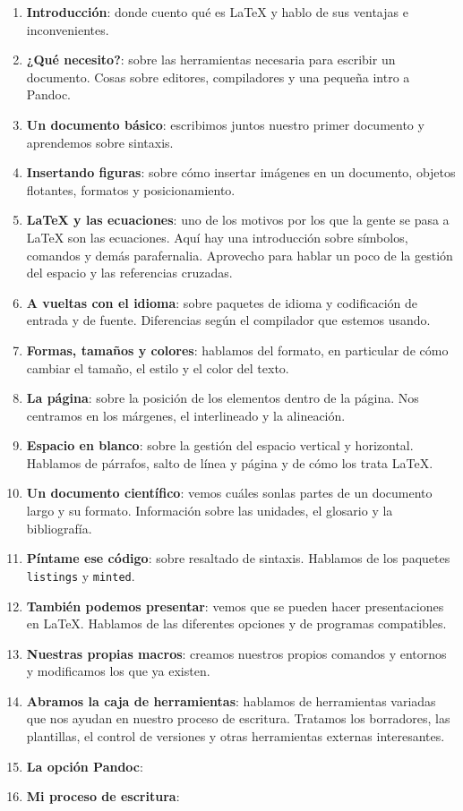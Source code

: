 \begin{enumerate}
\item
  \textbf{Introducción}: donde cuento qué es LaTeX y hablo de sus
  ventajas e inconvenientes.
\item
  \textbf{¿Qué necesito?}: sobre las herramientas necesaria para
  escribir un documento. Cosas sobre editores, compiladores y una
  pequeña intro a Pandoc.
\item
  \textbf{Un documento básico}: escribimos juntos nuestro primer
  documento y aprendemos sobre sintaxis.
\item
  \textbf{Insertando figuras}: sobre cómo insertar imágenes en un
  documento, objetos flotantes, formatos y posicionamiento.
\item
  \textbf{LaTeX y las ecuaciones}: uno de los motivos por los que la
  gente se pasa a LaTeX son las ecuaciones. Aquí hay una introducción
  sobre símbolos, comandos y demás parafernalia. Aprovecho para hablar
  un poco de la gestión del espacio y las referencias cruzadas.
\item
  \textbf{A vueltas con el idioma}: sobre paquetes de idioma y
  codificación de entrada y de fuente. Diferencias según el compilador
  que estemos usando.
\item
  \textbf{Formas, tamaños y colores}: hablamos del formato, en
  particular de cómo cambiar el tamaño, el estilo y el color del texto.
\item
  \textbf{La página}: sobre la posición de los elementos dentro de la
  página. Nos centramos en los márgenes, el interlineado y la
  alineación.
\item
  \textbf{Espacio en blanco}: sobre la gestión del espacio vertical y
  horizontal. Hablamos de párrafos, salto de línea y página y de cómo
  los trata LaTeX.
\item
  \textbf{Un documento científico}: vemos cuáles sonlas partes de un
  documento largo y su formato. Información sobre las unidades, el
  glosario y la bibliografía.
\item
  \textbf{Píntame ese código}: sobre resaltado de sintaxis. Hablamos de
  los paquetes \texttt{listings} y \texttt{minted}.
\item
  \textbf{También podemos presentar}: vemos que se pueden hacer
  presentaciones en LaTeX. Hablamos de las diferentes opciones y de
  programas compatibles.
\item
  \textbf{Nuestras propias macros}: creamos nuestros propios comandos y
  entornos y modificamos los que ya existen.
\item
  \textbf{Abramos la caja de herramientas}: hablamos de herramientas
  variadas que nos ayudan en nuestro proceso de escritura. Tratamos los
  borradores, las plantillas, el control de versiones y otras
  herramientas externas interesantes.
\item 
  \textbf{La opción Pandoc}:
\item
  \textbf{Mi proceso de escritura}:
\end{enumerate}

